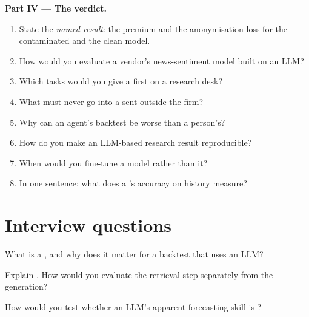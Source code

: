 \begin{problem}
\medskip\noindent\textbf{Part IV --- The verdict.}
\begin{enumerate}[resume]
\item State the \emph{named result}: the  premium and the anonymisation loss for the contaminated and the clean
model.
\item How would you evaluate a vendor's news-sentiment model built on an LLM?
\item Which tasks would you give a  first on a research desk?
\item What must never go into a  sent outside the firm?
\item Why can an agent's backtest be worse than a person's?
\item How do you make an LLM-based research result reproducible?
\item When would you fine-tune a model rather than  it?
\item In one sentence: what does a 's accuracy on history measure?
\end{enumerate}
\end{problem}

\section{Interview questions}

\begin{interviewq}\label{iq:ml:large-language-models-in-finance:1}
What is a , and why does it matter for a backtest that uses an LLM?
\end{interviewq}

\begin{interviewq}\label{iq:ml:large-language-models-in-finance:2}
Explain . How would you evaluate the retrieval step separately from the generation?
\end{interviewq}

\begin{interviewq}\label{iq:ml:large-language-models-in-finance:3}
How would you test whether an LLM's apparent forecasting skill is ?
\end{interviewq}

